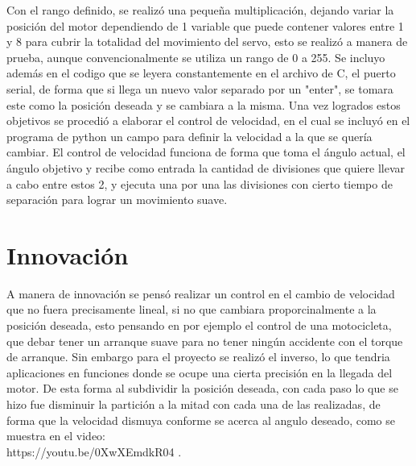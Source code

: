 \documentclass[letterpaper]{article}
\begin{document}
Con el rango definido, se realizó una pequeña multiplicación, dejando variar la posición del motor dependiendo de 1 variable que puede contener valores entre 1 y 8 para cubrir la totalidad del movimiento del servo, esto se realizó a manera de prueba, aunque convencionalmente se utiliza un rango de 0 a 255. Se incluyo además en el codigo que se leyera constantemente en el archivo de C, el puerto serial, de forma que si llega un nuevo valor separado por un "enter", se tomara este como la posición deseada y se cambiara a la misma.
Una vez logrados estos objetivos se procedió a elaborar el control de velocidad, en el cual se incluyó en el programa de python un campo para definir la velocidad a la que se quería cambiar. El control de velocidad funciona de forma que toma el ángulo actual, el ángulo objetivo y recibe como entrada la cantidad de divisiones que quiere llevar a cabo entre estos 2, y ejecuta una por una las divisiones con cierto tiempo de separación para lograr un movimiento suave. 

 
\newpage

\section{Innovación}
A manera de innovación se pensó realizar un control en el cambio de velocidad que no fuera precisamente lineal, si no que cambiara proporcinalmente a la posición deseada, esto pensando en por ejemplo el control de una motocicleta, que debar tener un arranque suave para no tener ningún accidente con el torque de arranque. Sin embargo para el proyecto se realizó el inverso, lo que tendria aplicaciones en funciones donde se ocupe una cierta precisión en la llegada del motor. De esta forma al subdividir la posición deseada, con cada paso lo que se hizo fue disminuir la partición a la mitad con cada una de las realizadas, de forma que la velocidad dismuya conforme se acerca al angulo deseado, como se muestra en el video: \\
https://youtu.be/0XwXEmdkR04
.

\newpage
\end{document}
